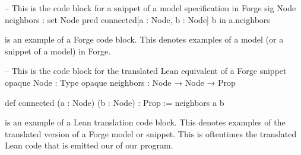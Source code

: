 \begin{forge}
-- This is the code block for a snippet of a model specification in Forge
sig Node {
  neighbors : set Node
}
pred connected[a : Node, b : Node] {
  b in a.neighbors
}
\end{forge}
is an example of a Forge code block. This denotes examples of a model (or a snippet of a model) in Forge. 

\begin{lean}
-- This is the code block for the translated Lean equivalent of a Forge snippet
opaque Node : Type
opaque neighbors : Node → Node → Prop

def connected (a : Node) (b : Node) : Prop :=
  neighbors a b
\end{lean}
is an example of a Lean translation code block. This denotes examples of the translated version of a Forge model or snippet. This is oftentimes the translated Lean code that is emitted our of our program. 